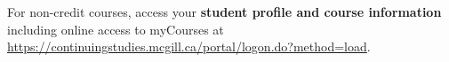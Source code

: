 \item[Athena]{For non-credit courses, access your {\bf student profile and
  course information} including online access to myCourses at
  \url{https://continuingstudies.mcgill.ca/portal/logon.do?method=load}.}
